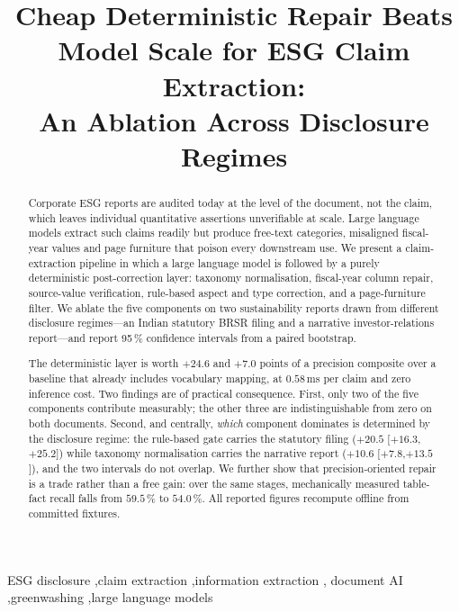 \documentclass[3p,times]{elsarticle}
\begin{document}
\begin{frontmatter}


\title{Cheap Deterministic Repair Beats Model Scale for ESG Claim Extraction:\\
An Ablation Across Disclosure Regimes}

\author{}
\address{}

\begin{abstract}
Corporate ESG reports are audited today at the level of the document, not the
claim, which leaves individual quantitative assertions unverifiable at scale.
Large language models extract such claims readily but produce free-text
categories, misaligned fiscal-year values and page furniture that poison every
downstream use. We present a claim-extraction pipeline in which a large language
model is followed by a purely deterministic post-correction layer: taxonomy
normalisation, fiscal-year column repair, source-value verification, rule-based
aspect and type correction, and a page-furniture filter. We ablate the five
components on two sustainability reports drawn from different disclosure
regimes---an Indian statutory BRSR filing and a narrative investor-relations
report---and report 95\,\% confidence intervals from a paired bootstrap.

The deterministic layer is worth $+24.6$ and $+7.0$ points of a precision
composite over a baseline that already includes vocabulary mapping, at
$0.58$\,ms per claim and zero inference cost. Two findings are of practical
consequence. First, only two of the five components contribute measurably; the
other three are indistinguishable from zero on both documents. Second, and
centrally, \emph{which} component dominates is determined by the disclosure
regime: the rule-based gate carries the statutory filing ($+20.5$
[$+16.3$,$+25.2$]) while taxonomy normalisation carries the narrative report
($+10.6$ [$+7.8$,$+13.5$]), and the two intervals do not overlap. We further show
that precision-oriented repair is a trade rather than a free gain: over the same
stages, mechanically measured table-fact recall falls from $59.5\,\%$ to
$54.0\,\%$. All reported figures recompute offline from committed fixtures.
\end{abstract}

\begin{keyword}
ESG disclosure \sep claim extraction \sep information extraction \sep
document AI \sep greenwashing \sep large language models
\end{keyword}

\end{frontmatter}
\end{document}
